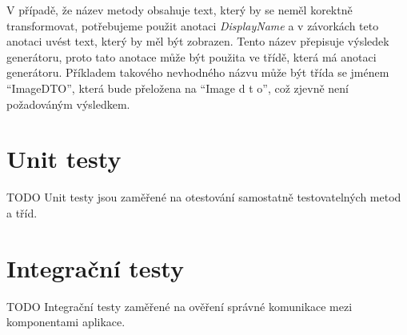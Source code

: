     V případě, že název metody obsahuje text, který by se neměl korektně transformovat, potřebujeme použit anotaci \textit{DisplayName} a v závorkách teto anotaci uvést text, který by měl být zobrazen. Tento název přepisuje výsledek generátoru, proto tato anotace může být použita ve třídě, která má anotaci generátoru. Příkladem takového nevhodného názvu může být třída se jménem \enquote{ImageDTO}, která bude přeložena na \enquote{Image d t o}, což zjevně není požadováným výsledkem.




    
\section{Unit testy}\label{testovani:unit}
    TODO Unit testy jsou zaměřené na otestování samostatně testovatelných metod a tříd.
    
\section{Integrační testy}\label{testovani:intergacni}
    TODO Integrační testy zaměřené na ověření správné komunikace mezi komponentami aplikace.
    

